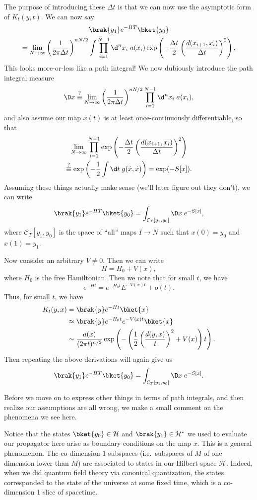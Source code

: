 \documentclass[a4paper]{article}
\begin{document}
The purpose of introducing these $\Delta t$ is that we can now use the asymptotic form of $K_t(y, t)$. We can now say
\begin{multline*}
  \brak{y_1} e^{-HT} \bket{y_0} \\
  = \lim_{N \to \infty} \left(\frac{1}{2\pi \Delta t}\right)^{nN/2} \int \prod_{i = 1}^{N - 1} \d^n x_i\; a(x_i) \exp\left(- \frac{\Delta t}{2}\left(\frac{d(x_{i + 1}, x_i)}{\Delta t}\right)^2\right).
\end{multline*}
This looks more-or-less like a path integral! We now dubiously introduce the path integral measure
\[
  \D x \overset{?}{\equiv} \lim_{N \to \infty} \left(\frac{1}{2\pi \Delta t}\right)^{nN/2} \prod_{i = 1}^{N - 1} \d^n x_i\; a(x_i),
\]
and also assume our map $x(t)$ is at least once-continuously differentiable, so that
\begin{multline*}
  \lim_{N \to \infty} \prod_{i = 1}^{N - 1} \exp\left(-\frac{\Delta t}{2} \left(\frac{d(x_{i + 1}, x_i)}{\Delta t}\right)^2 \right)\\
  \overset{?}{\equiv} \exp\left(-\frac{1}{2} \int \d t\; g(\dot{x}, \dot{x})\right) = \exp(-S[x]).
\end{multline*}
Assuming these things actually make sense (we'll later figure out they don't), we can write
\[
  \brak{y_1} e^{-HT} \bket{y_0} = \int_{\mathcal{C}_T[y_1, y_0]} \D x\; e^{-S[x]},
\]
where $\mathcal{C}_T[y_1, y_0]$ is the space of ``all'' maps $I \to N$ such that $x(0) = y_0$ and $x(1) = y_1$.

Now consider an arbitrary $V \not= 0$. Then we can write
\[
  H = H_0 + V(x),
\]
where $H_0$ is the free Hamiltonian. Then we note that for small $t$, we have
\[
  e^{-Ht} = e^{-H_0t}E^{-V(x)t} + o(t).
\]
Thus, for small $t$, we have
\begin{align*}
  K_t(y, x) &= \brak{y} e^{-Ht}\bket{x}\\
  &\approx \brak{y}e^{-H_0t} e^{-V(x) t}\bket{x}\\
  &\sim \frac{a(x)}{(2\pi t)^{n/2}} \exp\left(- \left(\frac{1}{2} \left(\frac{d(y, x)}{t}\right)^2 + V(x)\right) t\right).
\end{align*}
Then repeating the above derivations will again give us
\[
  \brak{y_1} e^{-HT} \bket{y_0} = \int_{\mathcal{C}_T[y_1, y_0]} \D x\; e^{-S[x]}.
\]

Before we move on to express other things in terms of path integrals, and then realize our assumptions are all wrong, we make a small comment on the phenomena we see here.

Notice that the states $\bket{y_0} \in \mathcal{H}$ and $\brak{y_1} \in \mathcal{H}^*$ we used to evaluate our propagator here arise as boundary conditions on the map $x$. This is a general phenomenon. The co-dimension-$1$ subspaces (i.e.\ subspaces of $M$ of one dimension lower than $M$) are associated to states in our Hilbert space $\mathcal{H}$. Indeed, when we did quantum field theory via canonical quantization, the states corresponded to the state of the universe at some fixed time, which is a co-dimension 1 slice of spacetime.
\end{document}
